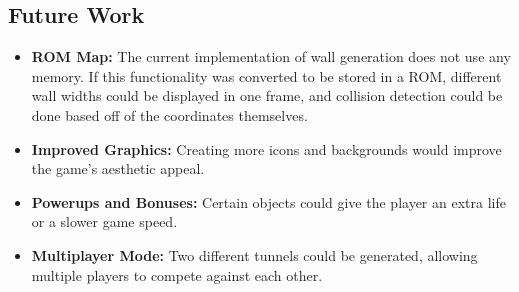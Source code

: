 \documentclass[11pt]{article}
\begin{document}
	\subsection{Future Work}

	
	\begin{itemize}
	\item \textbf{ROM Map:} The current implementation of wall generation does not use any memory.  If this functionality was converted to be stored in a ROM, different wall widths could be displayed in one frame, and collision detection could be done based off of the coordinates themselves. 
	\item \textbf{Improved Graphics:} Creating more icons and backgrounds would improve the game's aesthetic appeal.
	\item \textbf{Powerups and Bonuses:} Certain objects could give the player an extra life or a slower game speed.
	\item \textbf{Multiplayer Mode:} Two different tunnels could be generated, allowing multiple players to compete against each other. 
	
	\end{itemize}
\end{document}
